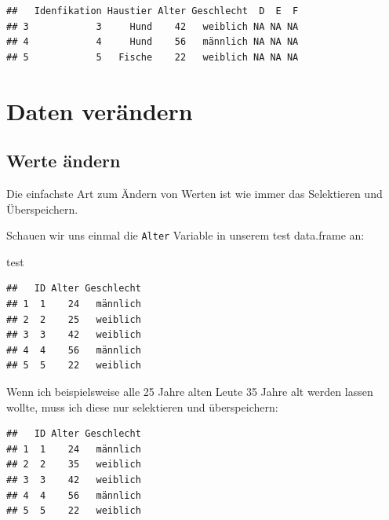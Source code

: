\documentclass[
]{book}
\newenvironment{Shaded}{\begin{snugshade}}{\end{snugshade}}
\newcommand{\DecValTok}[1]{\textcolor[rgb]{0.00,0.00,0.81}{#1}}
\newcommand{\NormalTok}[1]{#1}
\newcommand{\OtherTok}[1]{\textcolor[rgb]{0.56,0.35,0.01}{#1}}
\newcommand{\SpecialCharTok}[1]{\textcolor[rgb]{0.00,0.00,0.00}{#1}}
\begin{document}
\begin{verbatim}
##   Idenfikation Haustier Alter Geschlecht  D  E  F
## 3            3     Hund    42   weiblich NA NA NA
## 4            4     Hund    56   männlich NA NA NA
## 5            5   Fische    22   weiblich NA NA NA
\end{verbatim}

\hypertarget{daten-veruxe4ndern}{%
\section{Daten verändern}\label{daten-veruxe4ndern}}

\hypertarget{werte-uxe4ndern}{%
\subsection{Werte ändern}\label{werte-uxe4ndern}}

Die einfachste Art zum Ändern von Werten ist wie immer das Selektieren und Überspeichern.

Schauen wir uns einmal die \texttt{Alter} Variable in unserem test data.frame an:

\begin{Shaded}
\begin{Highlighting}[]
\NormalTok{test}
\end{Highlighting}
\end{Shaded}

\begin{verbatim}
##   ID Alter Geschlecht
## 1  1    24   männlich
## 2  2    25   weiblich
## 3  3    42   weiblich
## 4  4    56   männlich
## 5  5    22   weiblich
\end{verbatim}

Wenn ich beispielsweise alle 25 Jahre alten Leute 35 Jahre alt werden lassen wollte, muss ich diese nur selektieren und überspeichern:

\begin{Shaded}
\end{Shaded}

\begin{verbatim}
##   ID Alter Geschlecht
## 1  1    24   männlich
## 2  2    35   weiblich
## 3  3    42   weiblich
## 4  4    56   männlich
## 5  5    22   weiblich
\end{verbatim}
\end{document}
